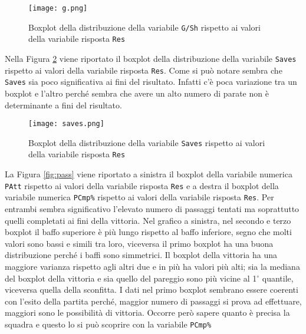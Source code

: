 \begin{figure}[htbp]
	\begin{center}
		\texttt{[image: g.png]}
		\caption{Boxplot della distribuzione della variabile \texttt{G/Sh} rispetto ai valori della variabile risposta \texttt{Res} } \label{fig:g}
	\end{center}
\end{figure}

Nella Figura \ref{fig:saves} viene riportato il boxplot della distribuzione della variabile \texttt{Saves} rispetto ai valori della variabile risposta \texttt{Res}. Come si può notare sembra che \texttt{Saves} sia poco significativa ai fini del risultato. Infatti c'è poca variazione tra un boxplot e l'altro perché sembra che avere un alto numero di parate non è determinante a fini del risultato.\\

\begin{figure}[htbp]
	\begin{center}
		\texttt{[image: saves.png]}
		\caption{Boxplot della distribuzione della variabile \texttt{Saves} rispetto ai valori della variabile risposta \texttt{Res} } \label{fig:saves}
	\end{center}
\end{figure}

La Figura \ref{fig:pass} viene riportato a sinistra il boxplot della variabile numerica \texttt{PAtt} rispetto ai valori della variabile risposta \texttt{Res} e a destra il boxplot della variabile numerica \texttt{PCmp\%} rispetto ai valori della variabile risposta \texttt{Res}. Per entrambi sembra significativo l'elevato numero di passaggi tentati ma soprattutto quelli completati ai fini della vittoria. Nel grafico a sinistra, nel secondo e terzo boxplot il baffo superiore è più lungo rispetto al baffo inferiore, segno che molti valori sono bassi e simili tra loro, viceversa il primo boxplot ha una buona distribuzione perché i baffi sono simmetrici. Il boxplot della vittoria ha una maggiore varianza rispetto agli altri due e in più ha valori più alti; sia la mediana del boxplot della vittoria e sia quello del pareggio sono più vicine al 1$^{\circ}$ quantile, viceversa quella della sconfitta. I dati nel primo boxplot sembrano essere coerenti con l'esito della partita perché, maggior numero di passaggi si prova ad effettuare, maggiori sono le possibilità di vittoria. Occorre però sapere quanto è precisa la squadra e questo lo si può scoprire con la variabile \texttt{PCmp\%}\\

